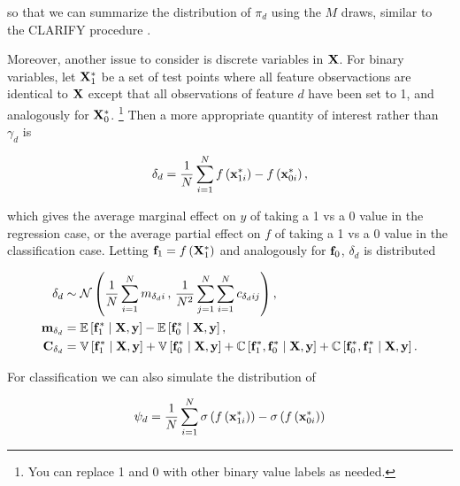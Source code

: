 \documentclass{draft}
\begin{document}
so that we can summarize the distribution of \( \pi_d \) using the \( M \) draws,
similar to the CLARIFY procedure \citep{KingEtAl2000Making}.

Moreover, another issue to consider is discrete variables in \( \mathbf{X} \).
For binary variables, let \( \mathbf{X}_1^\ast \) be a set of test points where all feature observactions are identical to \( \mathbf{X} \)
except that all observations of feature \( d \) have been set to 1, and analogously for \( \mathbf{X}_0^\ast \).%
\footnote{
    You can replace 1 and 0 with other binary value labels as needed.
}
Then a more appropriate quantity of interest rather than \( \gamma_d \) is

\begin{equation}
    \delta_d = \dfrac{1}{N} \sum_{i=1}^N f \left( \mathbf{x}_{1i}^\ast \right) - f \left( \mathbf{x}_{0i}^\ast \right),
\end{equation}

\noindent
which gives the average marginal effect on \( y \) of taking a 1 vs a 0 value in the regression case,
or the average partial effect on \( f \) of taking a 1 vs a 0 value in the classification case.
Letting \( \mathbf{f}_1 = f \left( \mathbf{X}_1^\ast \right) \) and analogously for \( \mathbf{f}_0 \), \( \delta_d \) is distributed

\begin{align}
    \delta_d
    & \sim
    \mathcal{N} \left(
        \dfrac{1}{N} \sum_{i=1}^N m_{\delta_d i} \, , \,
        \dfrac{1}{N^2} \sum_{j=1}^N \sum_{i=1}^N c_{\delta_d ij}
    \right), \label{eq:avg-difference-distribution1} \\
    \mathbf{m}_{\delta_d} & = \operatorname{\mathbb{E}} \left[ \mathbf{f}_1^\ast \mid \mathbf{X}, \mathbf{y} \right] - \operatorname{\mathbb{E}} \left[ \mathbf{f}_0^\ast \mid \mathbf{X}, \mathbf{y} \right], \\
    \mathbf{C}_{\delta_d}
    & =
    \operatorname{\mathbb{V}} \left[ \mathbf{f}_1^\ast \mid \mathbf{X}, \mathbf{y} \right]
    + \operatorname{\mathbb{V}} \left[ \mathbf{f}_0^\ast \mid \mathbf{X}, \mathbf{y} \right]
    + \operatorname{\mathbb{C}} \left[ \mathbf{f}_1^\ast, \mathbf{f}_0^\ast  \mid \mathbf{X}, \mathbf{y} \right]
    + \operatorname{\mathbb{C}} \left[ \mathbf{f}_0^\ast, \mathbf{f}_1^\ast \mid \mathbf{X}, \mathbf{y} \right].
\end{align}

For classification we can also simulate the distribution of

\begin{equation}
    \psi_d = \dfrac{1}{N} \sum_{i=1}^N \sigma \left( f \left( \mathbf{x}_{1i}^\ast \right) \right) - \sigma \left( f \left( \mathbf{x}_{0i}^\ast \right) \right)
\end{equation}
\end{document}
